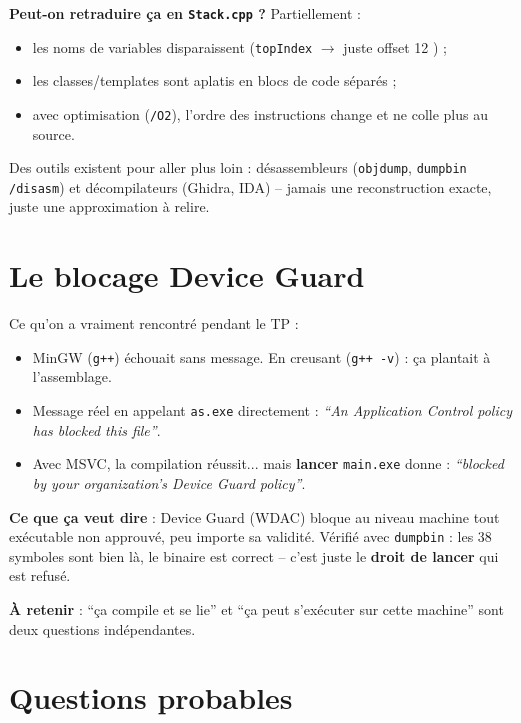 \documentclass[11pt,a4paper]{article}
\newcommand{\pt}[1]{\textbf{\color{bleu}#1}}
\begin{document}
\pt{Peut-on retraduire ça en \texttt{Stack.cpp} ?} Partiellement :
\begin{itemize}
\item les noms de variables disparaissent (\texttt{topIndex} $\to$ juste \og offset 12 \fg) ;
\item les classes/templates sont aplatis en blocs de code séparés ;
\item avec optimisation (\texttt{/O2}), l'ordre des instructions change et ne colle plus au source.
\end{itemize}
Des outils existent pour aller plus loin : désassembleurs (\texttt{objdump}, \texttt{dumpbin /disasm}) et décompilateurs (Ghidra, IDA) -- jamais une reconstruction exacte, juste une approximation à relire.

\section{Le blocage Device Guard}
\label{sec:dg}

Ce qu'on a vraiment rencontré pendant le TP :

\begin{itemize}
\item MinGW (\texttt{g++}) échouait sans message. En creusant (\texttt{g++ -v}) : ça plantait à l'assemblage.
\item Message réel en appelant \texttt{as.exe} directement : \textit{``An Application Control policy has blocked this file''}.
\item Avec MSVC, la compilation réussit... mais \textbf{lancer} \texttt{main.exe} donne : \textit{``blocked by your organization's Device Guard policy''}.
\end{itemize}

\pt{Ce que ça veut dire} : Device Guard (WDAC) bloque au niveau machine tout exécutable non approuvé, peu importe sa validité. Vérifié avec \texttt{dumpbin} : les 38 symboles sont bien là, le binaire est correct -- c'est juste le \textbf{droit de lancer} qui est refusé.

\pt{À retenir} : ``ça compile et se lie'' et ``ça peut s'exécuter sur cette machine'' sont deux questions indépendantes.

\section{Questions probables}
\end{document}
